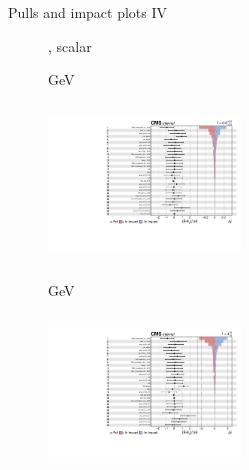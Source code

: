\documentclass[8pt]{beamer}
\begin{document}
\begin{frame}{Pulls and impact plots IV}
\justifying
\begin{figure}[htbp]
\centering
\begin{block}{, scalar}\end{block}	\vspace{-8pt}

\begin{minipage}[b]{0.49\textwidth}
\begin{center}
\centering \begin{block}{ GeV}\end{block}	
\includegraphics[width=5.1cm, height=4.2cm]{figs/impacts_2018_both_scalar_100.pdf}
\end{center}
\end{minipage}\hfill
\begin{minipage}[b]{0.49\textwidth}
\begin{center}
\centering \begin{block}{ GeV}\end{block}	
\includegraphics[width=5.1cm, height=4.2cm]{figs/impacts_2018_both_scalar_500.pdf}
\end{center}
\end{minipage} \hfill
\end{figure}
\end{frame}
\end{document}
